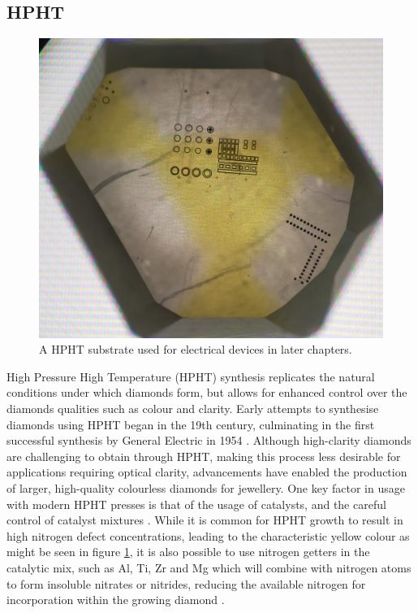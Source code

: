\begin{refsection}
\subsection{HPHT}
\begin{figure}
	\centering
	\includegraphics[width=0.5\linewidth]{Chapter7/Figs/Raster/optical back light.jpg}
	\caption{A HPHT substrate used for electrical devices in later chapters.}
	\label{fig:sample1}
\end{figure}
High Pressure High Temperature (HPHT) synthesis replicates the natural conditions under which diamonds form, but allows for enhanced control over the diamonds qualities such as colour and clarity. Early attempts to synthesise diamonds using HPHT began in the 19th century, culminating in the first successful synthesis by General Electric in 1954 \cite{BUNDY1955}. Although high-clarity diamonds are challenging to obtain through HPHT, making this process less desirable for applications requiring optical clarity, advancements have enabled the production of larger, high-quality colourless diamonds for jewellery. One key factor in usage with modern HPHT presses is that of the usage of catalysts, and the careful control of catalyst mixtures \cite{Strong1963}. While it is common for HPHT growth to result in high nitrogen defect concentrations, leading to the characteristic yellow colour as might be seen in figure \ref{fig:sample1}, it is also possible to use nitrogen getters in the catalytic mix, such as Al, Ti, Zr and Mg which will combine with nitrogen atoms to form insoluble nitrates or nitrides, reducing the available nitrogen for incorporation within the growing diamond \cite{Soffner2020}.


\end{refsection}

